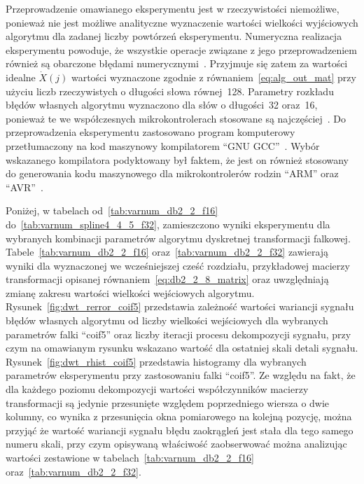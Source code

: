 Przeprowadzenie omawianego eksperymentu jest w rzeczywistości niemożliwe, ponieważ nie jest możliwe analityczne wyznaczenie wartości wielkości wyjściowych algorytmu dla zadanej liczby powtórzeń eksperymentu. Numeryczna realizacja eksperymentu powoduje, że wszystkie operacje związane z jego przeprowadzeniem również są obarczone błędami numerycznymi~\cite{benz_floats}. Przyjmuje się zatem za wartości idealne $\dot{X}(j)$ wartości wyznaczone zgodnie z równaniem~\eqref{eq:alg_out_mat} przy użyciu liczb rzeczywistych o długości słowa równej~\qty{128}{\bitOw}. Parametry rozkładu błędów własnych algorytmu wyznaczono dla słów o długości~\qty{32}{\bitOw} oraz~\qty{16}{\bitOw}, ponieważ te we współczesnych mikrokontrolerach stosowane są najczęściej~\cite{cortex_dsp, kim_compilers}. Do przeprowadzenia eksperymentu zastosowano program komputerowy przetłumaczony na kod maszynowy kompilatorem \enquote{GNU GCC}~\cite{gcc_manual}. Wybór wskazanego kompilatora podyktowany był faktem, że jest on również stosowany do generowania kodu maszynowego dla mikrokontrolerów rodzin \enquote{ARM} oraz \enquote{AVR}~\cite{kim_compilers, gcc_manual}.

Poniżej, w tabelach od~\ref{tab:varnum_db2_2_f16} do~\ref{tab:varnum_spline4_4_5_f32}, zamieszczono wyniki eksperymentu dla wybranych kombinacji parametrów algorytmu dyskretnej transformacji falkowej. Tabele~\ref{tab:varnum_db2_2_f16} oraz~\ref{tab:varnum_db2_2_f32} zawierają wyniki dla wyznaczonej we wcześniejszej cześć rozdziału, przykładowej macierzy transformacji opisanej równaniem~\eqref{eq:db2_2_8_matrix} oraz uwzględniają zmianę zakresu wartości wielkości wejściowych algorytmu. Rysunek~\ref{fig:dwt_rerror_coif5} przedstawia zależność wartości wariancji sygnału błędów własnych algorytmu od liczby wielkości wejściowych dla wybranych parametrów falki \enquote{coif5} oraz liczby iteracji procesu dekompozycji sygnału, przy czym na omawianym rysunku wskazano wartość dla ostatniej skali detali sygnału. Rysunek~\ref{fig:dwt_rhist_coif5} przedstawia histogramy dla wybranych parametrów eksperymentu przy zastosowaniu falki \enquote{coif5}. Ze względu na fakt, że dla każdego poziomu dekompozycji wartości współczynników macierzy transformacji są jedynie przesunięte względem poprzedniego wiersza o dwie kolumny, co wynika z przesunięcia okna pomiarowego na kolejną pozycję, można przyjąć że wartość wariancji sygnału błędu zaokrągleń jest stała dla tego samego numeru skali, przy czym opisywaną właściwość zaobserwować można analizując wartości zestawione w tabelach~\ref{tab:varnum_db2_2_f16} oraz~\ref{tab:varnum_db2_2_f32}.

